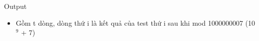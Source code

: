 Output
\begin{itemize}
	\item     Gồm t dòng, dòng thứ i là kết quả của test thứ i sau khi mod 1000000007 (10    $^     9    $    + 7)   
\end{itemize}